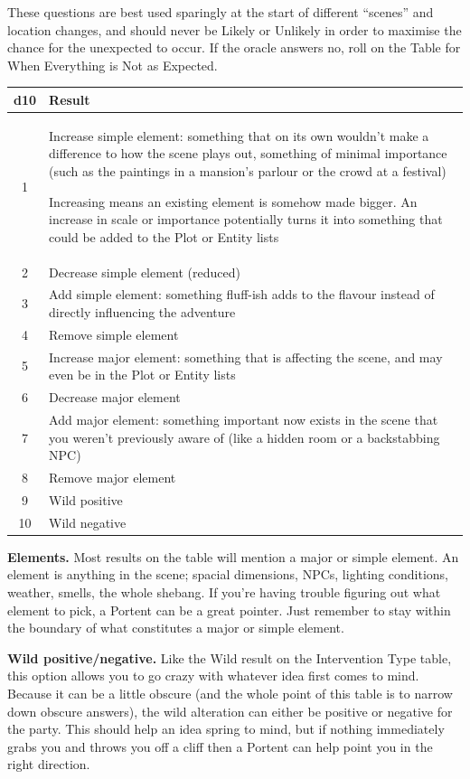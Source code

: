 \documentclass[12pt, letterpaper]{article}
\begin{document}
 These questions are best used sparingly at the start of different ``scenes'' and location changes, and should never be Likely or Unlikely in order to maximise the chance for the unexpected to occur. If the oracle answers no, roll on the Table for When Everything is Not as Expected.

\noindent\begin{tabularx}{\linewidth}{|c|X|}
\hline
\textbf{d10} & \textbf{Result} \\
\hline
1 & Increase simple element: something that on its own wouldn't make a difference to how the scene plays out, something of minimal importance (such as the paintings in a mansion's parlour or the crowd at a festival)\par\smallskip
Increasing means an existing element is somehow made bigger. An increase in scale or importance potentially turns it into something that could be added to the Plot or Entity lists\\
\hline
2 & Decrease simple element (reduced) \\
\hline
3 & Add simple element: something fluff-ish adds to the flavour instead of directly influencing the adventure \\
\hline
4 & Remove simple element \\
\hline
5 & Increase major element: something that is affecting the scene, and may even be in the Plot or Entity lists \\
\hline
6 & Decrease major element \\
\hline
7 & Add major element: something important now exists in  the scene that you weren't previously aware of (like a hidden room or a backstabbing NPC) \\
\hline
8 & Remove major element \\
\hline
9 & Wild positive \\
\hline
10 & Wild negative \\
\hline
\end{tabularx}

\textbf{Elements.} Most results on the table will mention a major or simple element. An element is anything in the scene; spacial dimensions, NPCs, lighting conditions, weather, smells, the whole shebang. If you're having trouble figuring out what element to pick, a Portent can be a great pointer. Just remember to stay within the boundary of what constitutes a major or simple element.

\textbf{Wild positive/negative.} Like the Wild result on the Intervention Type table, this option allows you to go crazy with whatever idea first comes to mind. Because it can be a little obscure (and the whole point of this table is to narrow down obscure answers), the wild alteration can either be positive or negative for the party. This should help an idea spring to mind, but if nothing immediately grabs you and throws you off a cliff then a Portent can help point you in the right direction.
\end{document}
